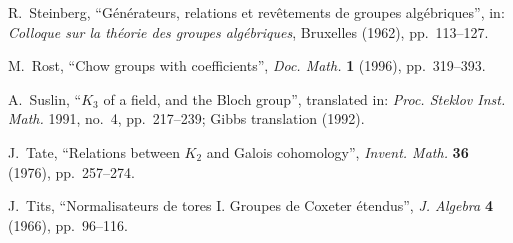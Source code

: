 \documentclass[11pt,a4paper]{article}
\theoremstyle{plain}
\theoremstyle{definition}
\begin{document}
\begin{enumerate}[label={[\arabic*]}, leftmargin=*]
\item R.~Steinberg, ``G\'en\'erateurs, relations et rev\^etements de groupes alg\'ebriques'', in: \textit{Colloque sur la th\'eorie des groupes alg\'ebriques}, Bruxelles (1962), pp.~113--127.

\item M.~Rost, ``Chow groups with coefficients'', \textit{Doc. Math.} \textbf{1} (1996), pp.~319--393.

\item A.~Suslin, ``$K_3$ of a field, and the Bloch group'', translated in: \textit{Proc. Steklov Inst. Math.} 1991, no.~4, pp.~217--239; Gibbs translation (1992).

\item J.~Tate, ``Relations between $K_2$ and Galois cohomology'', \textit{Invent. Math.} \textbf{36} (1976), pp.~257--274.

\item J.~Tits, ``Normalisateurs de tores I. Groupes de Coxeter \'etendus'', \textit{J. Algebra} \textbf{4} (1966), pp.~96--116.
\end{enumerate}
\end{document}
